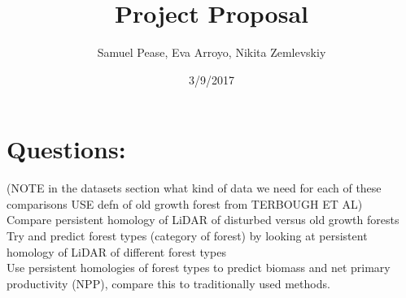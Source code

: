 \documentclass[11pt]{article}
\title{Project Proposal}
\author{Samuel Pease, Eva Arroyo, Nikita Zemlevskiy}
\date{3/9/2017}
\begin{document}
\maketitle
\newpage
\section*{Questions:}
(NOTE in the datasets section what kind of data we need for each of these comparisons USE defn of old growth forest from TERBOUGH ET AL)\\
Compare persistent homology of LiDAR of disturbed versus old growth forests\\
Try and predict forest types (category of forest) by looking at persistent homology of LiDAR of different forest types\\
Use persistent homologies of forest types to predict biomass and net primary productivity (NPP), compare this to traditionally used methods.\\
\end{document}

